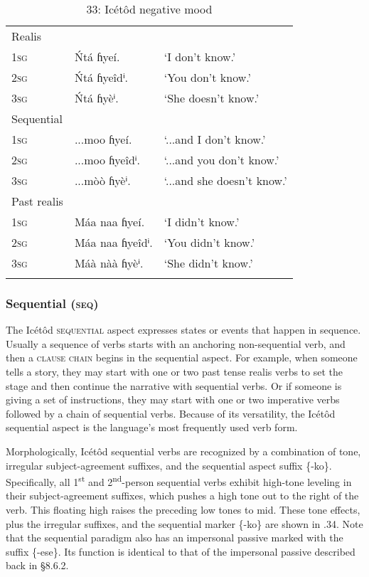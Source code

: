 \begin{table}
\begin{table}
\caption{33: Icétôd negative mood}
\label{tab:8}


\begin{tabularx}{\textwidth}{XXX}
\lsptoprule

Realis &  & \\
\textsc{1sg} & \'{N}tá ɦyeí. & ‘I don’t know.’\\
\textsc{2sg} & \'{N}tá ɦyeîdⁱ. & ‘You don’t know.’\\
\textsc{3sg} & \'{N}tá ɦyèⁱ. & ‘She doesn’t know.’\\
Sequential &  & \\
\textsc{1sg} & ...moo ɦyeí. & ‘...and I don’t know.’\\
\textsc{2sg} & ...moo ɦyeîdⁱ. & ‘...and you don’t know.’\\
\textsc{3sg} & ...mòò ɦyèⁱ. & ‘...and she doesn’t know.’\\
Past realis &  & \\
\textsc{1sg} & Máa naa ɦyeí. & ‘I didn’t know.’\\
\textsc{2sg} & Máa naa ɦyeîdⁱ. & ‘You didn’t know.’\\
\textsc{3sg} & Máà nàà ɦyèⁱ. & ‘She didn’t know.’\\
\lspbottomrule
\end{tabularx}
\end{table}

\subsubsection{Sequential (\textsc{seq})}

The Icétôd \textsc{sequential }aspect expresses states or events that happen in sequence. Usually a sequence of verbs starts with an anchoring non-sequential verb, and then a \textsc{clause} \textsc{chain} begins in the sequential aspect. For example, when someone tells a story, they may start with one or two past tense realis verbs to set the stage and then continue the narrative with sequential verbs. Or if someone is giving a set of instructions, they may start with one or two imperative verbs followed by a chain of sequential verbs. Because of its versatility, the Icétôd sequential aspect is the language’s most frequently used verb form.

Morphologically, Icétôd sequential verbs are recognized by a combination of tone, irregular subject-agreement suffixes, and the sequential aspect suffix \{-ko\}. Specifically, all 1\textsuperscript{st} and 2\textsuperscript{nd}{}-person sequential verbs exhibit high-tone leveling in their subject-agreement suffixes, which pushes a high tone out to the right of the verb. This floating high raises the preceding low tones to mid. These tone effects, plus the irregular suffixes, and the sequential marker \{-ko\} are shown in .34. Note that the sequential paradigm also has an impersonal passive marked with the suffix \{-ese\}. Its function is identical to that of the impersonal passive described back in §8.6.2.



\end{table}
